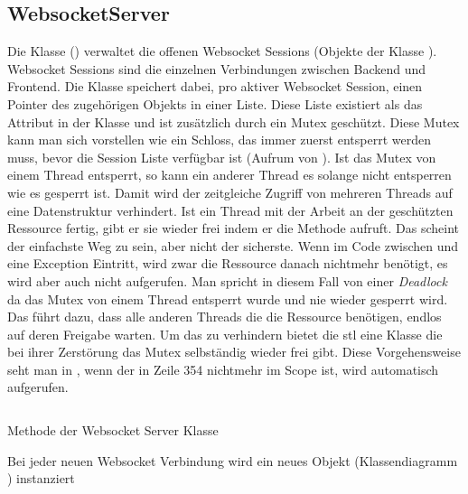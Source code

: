 \subsection{WebsocketServer}
Die Klasse  () verwaltet die offenen Websocket Sessions (Objekte der Klasse ). 
Websocket Sessions sind die einzelnen Verbindungen zwischen Backend und Frontend.
Die  Klasse speichert dabei, pro aktiver Websocket Session, einen Pointer des zugehörigen  Objekts in einer Liste.
Diese Liste existiert als das Attribut  in der Klasse  und ist zusätzlich durch ein Mutex geschützt.
Diese Mutex kann man sich vorstellen wie ein Schloss, das immer zuerst entsperrt werden muss, 
bevor die Session Liste verfügbar ist (Aufrum von ). 
Ist das Mutex von einem Thread entsperrt, so kann ein anderer Thread es solange nicht entsperren wie es gesperrt ist.
Damit wird der zeitgleiche Zugriff von mehreren Threads auf eine Datenstruktur verhindert.
Ist ein Thread mit der Arbeit an der geschützten Ressource fertig, gibt er sie wieder frei indem er die Methode  aufruft.
Das scheint der einfachste Weg zu sein, aber nicht der sicherste. 
Wenn im Code zwischen  und  eine Exception Eintritt, 
wird zwar die Ressource danach nichtmehr benötigt, es wird aber auch nicht  aufgerufen.
Man spricht in diesem Fall von einer \emph{Deadlock} da das Mutex von einem Thread entsperrt wurde und nie wieder gesperrt wird. 
Das führt dazu, dass alle anderen Threads die die Ressource benötigen, endlos auf deren Freigabe warten. 
Um das zu verhindern bietet die \ac{stl} eine  Klasse die bei ihrer Zerstörung das Mutex selbständig wieder frei gibt.
Diese Vorgehensweise seht man in , wenn der  in Zeile 354 nichtmehr im Scope ist, wird automatisch  aufgerufen.
\begin{listing}[ht]
  \inputminted[linenos=true,breaklines=true, firstline=348, lastline=354]{c++}{../Backend/WebsocketServer.cpp}
  \caption{Methode  der Websocket Server Klasse}
  \label{list:addSession}
\end{listing}
Bei jeder neuen Websocket Verbindung wird ein neues  Objekt (Klassendiagramm ) instanziert 
